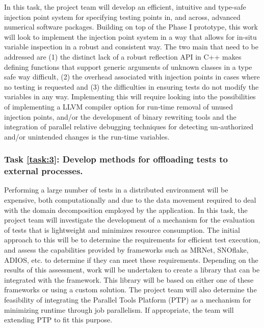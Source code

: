 In this task, the project team will develop an efficient, intuitive and type-safe injection point system for specifying testing points in, and across, advanced numerical software packages. Building on top of the Phase I prototype, this work will look to implement the injection point system in a way that allows for in-situ variable inspection in a robust and consistent way. The two main that need to be addressed are (1) the distinct lack of a robust reflection API in C++ makes defining functions that support generic arguments of unknown classes in a type safe way difficult, (2) the overhead associated with \VV injection points in cases where no testing is requested and (3) the difficulties in ensuring tests do not modify the variables in any way. Implementing this will require looking into the possibilities of implementing a LLVM compiler option for run-time removal of unused injection points, and/or the development of binary rewriting tools and the integration of parallel relative debugging techniques for detecting un-authorized and/or unintended changes is the run-time variables. 



\label{task:3}
\subsubsection{Task \ref{task:3}: Develop methods for offloading tests to external processes. }
Performing a large number of \VV tests in a distributed environment will be expensive, both computationally and due to the data movement required to deal with the domain decomposition employed by the application. In this task, the project team will investigate the development of a mechanism for the evaluation of \VV tests that is lightweight and minimizes resource consumption. The initial approach to this will be to determine the requirements for efficient \VV test execution, and assess the capabilities provided by frameworks such as MRNet, SNOflake, ADIOS, etc. to determine if they can meet these requirements. Depending on the results of this assessment, work will be undertaken to create a library that can be integrated with the \VV framework. This library will be based on either one of these frameworks or using a custom solution. The project team will also determine the feasibility of integrating the Parallel Tools Platform (PTP) as a mechanism for minimizing \VV runtime through job parallelism. If appropriate, the team will extending PTP to fit this purpose.   

